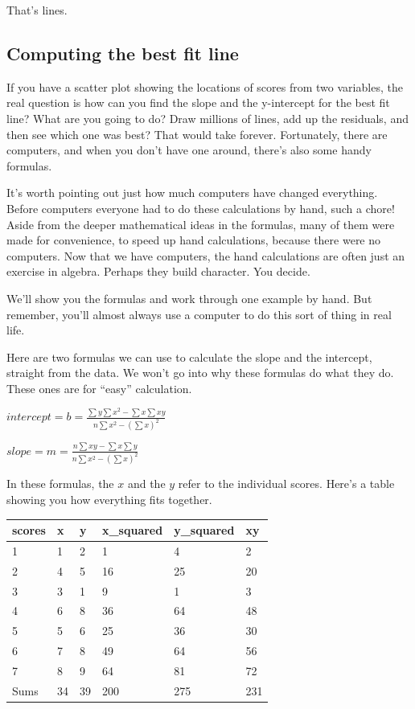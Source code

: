 \documentclass[
]{book}
\begin{document}
That's lines.

\subsection{Computing the best fit line}\label{computing-the-best-fit-line}

If you have a scatter plot showing the locations of scores from two variables, the real question is how can you find the slope and the y-intercept for the best fit line? What are you going to do? Draw millions of lines, add up the residuals, and then see which one was best? That would take forever. Fortunately, there are computers, and when you don't have one around, there's also some handy formulas.

It's worth pointing out just how much computers have changed everything. Before computers everyone had to do these calculations by hand, such a chore! Aside from the deeper mathematical ideas in the formulas, many of them were made for convenience, to speed up hand calculations, because there were no computers. Now that we have computers, the hand calculations are often just an exercise in algebra. Perhaps they build character. You decide.

We'll show you the formulas and work through one example by hand. But remember, you'll almost always use a computer to do this sort of thing in real life.

Here are two formulas we can use to calculate the slope and the intercept, straight from the data. We won't go into why these formulas do what they do. These ones are for ``easy'' calculation.

\(intercept = b = \frac{\sum{y}\sum{x^2}-\sum{x}\sum{xy}}{n\sum{x^2}-(\sum{x})^2}\)

\(slope = m = \frac{n\sum{xy}-\sum{x}\sum{y}}{n\sum{x^2}-(\sum{x})^2}\)

In these formulas, the \(x\) and the \(y\) refer to the individual scores. Here's a table showing you how everything fits together.

\begin{tabular}{l|l|l|l|l|l}
\hline
scores & x & y & x\_squared & y\_squared & xy\\
\hline
1 & 1 & 2 & 1 & 4 & 2\\
\hline
2 & 4 & 5 & 16 & 25 & 20\\
\hline
3 & 3 & 1 & 9 & 1 & 3\\
\hline
4 & 6 & 8 & 36 & 64 & 48\\
\hline
5 & 5 & 6 & 25 & 36 & 30\\
\hline
6 & 7 & 8 & 49 & 64 & 56\\
\hline
7 & 8 & 9 & 64 & 81 & 72\\
\hline
Sums & 34 & 39 & 200 & 275 & 231\\
\hline
\end{tabular}
\end{document}
